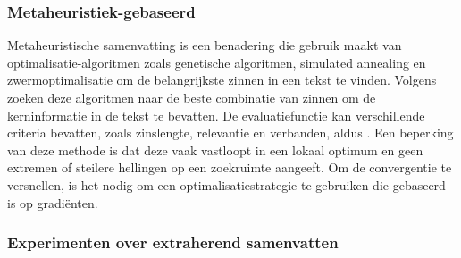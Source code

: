 \subsubsection{Metaheuristiek-gebaseerd}

Metaheuristische samenvatting is een benadering die gebruik maakt van optimalisatie-algoritmen zoals genetische algoritmen, simulated annealing en zwermoptimalisatie om de belangrijkste zinnen in een tekst te vinden. Volgens \textcite{Premjith2015, Verma2020} zoeken deze algoritmen naar de beste combinatie van zinnen om de kerninformatie in de tekst te bevatten. De evaluatiefunctie kan verschillende criteria bevatten, zoals zinslengte, relevantie en verbanden, aldus \textcite{Rani2021}. Een beperking van deze methode is dat deze vaak vastloopt in een lokaal optimum en geen extremen of steilere hellingen op een zoekruimte aangeeft. Om de convergentie te versnellen, is het nodig om een optimalisatiestrategie te gebruiken die gebaseerd is op gradiënten.



\subsubsection{Experimenten over extraherend samenvatten}

